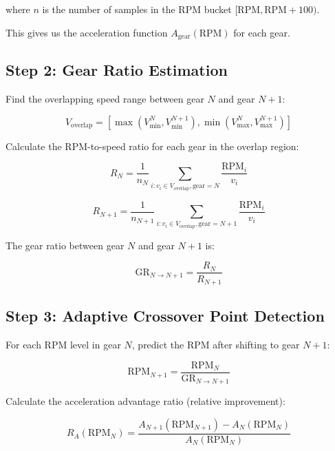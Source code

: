 \documentclass[12pt]{article}
\begin{document}
where $n$ is the number of samples in the RPM bucket $[\text{RPM}, \text{RPM}+100)$.

This gives us the acceleration function $A_{\text{gear}}(\text{RPM})$ for each gear.

\subsection{Step 2: Gear Ratio Estimation}

Find the overlapping speed range between gear $N$ and gear $N+1$:

\begin{equation}
V_{\text{overlap}} = \left[\max\left(V_{\min}^N, V_{\min}^{N+1}\right), \min\left(V_{\max}^N, V_{\max}^{N+1}\right)\right]
\end{equation}

Calculate the RPM-to-speed ratio for each gear in the overlap region:

\begin{equation}
R_N = \frac{1}{n_N} \sum_{i: v_i \in V_{\text{overlap}}, \text{gear}=N} \frac{\text{RPM}_i}{v_i}
\end{equation}

\begin{equation}
R_{N+1} = \frac{1}{n_{N+1}} \sum_{i: v_i \in V_{\text{overlap}}, \text{gear}=N+1} \frac{\text{RPM}_i}{v_i}
\end{equation}

The gear ratio between gear $N$ and gear $N+1$ is:

\begin{equation}
\text{GR}_{N \to N+1} = \frac{R_N}{R_{N+1}}
\end{equation}

\subsection{Step 3: Adaptive Crossover Point Detection}

For each RPM level in gear $N$, predict the RPM after shifting to gear $N+1$:

\begin{equation}
\text{RPM}_{N+1} = \frac{\text{RPM}_N}{\text{GR}_{N \to N+1}}
\end{equation}

Calculate the acceleration advantage ratio (relative improvement):

\begin{equation}
R_A(\text{RPM}_N) = \frac{A_{N+1}(\text{RPM}_{N+1}) - A_N(\text{RPM}_N)}{A_N(\text{RPM}_N)}
\end{equation}
\end{document}
